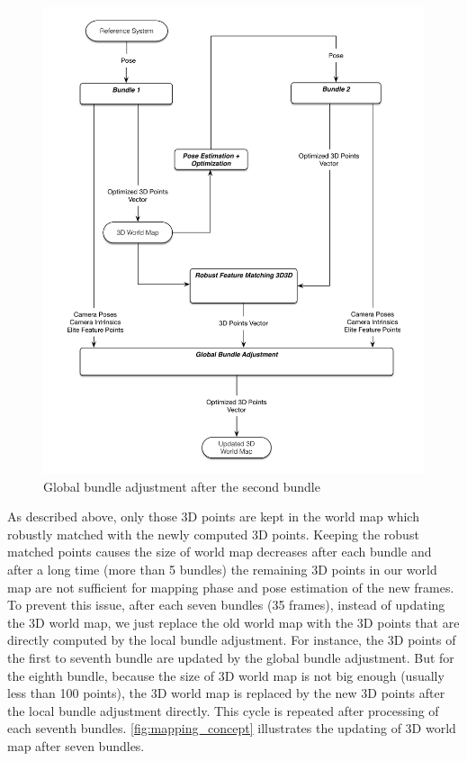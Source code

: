 \begin{figure}[H]
  \centering
  \includegraphics[width=120mm]{figures/global_bundle_adjustment}
  \caption{Global bundle adjustment after the second bundle}\label{fig:global_bundle_adjustment}
\end{figure}

As described above, only those 3D points are kept in the world map which robustly matched with the newly computed 3D points. Keeping the robust matched points causes the size of world map decreases after each bundle and after a long time (more than 5 bundles) the remaining 3D points in our world map are not sufficient for mapping phase and pose estimation of the new frames. To prevent this issue, after each seven bundles (35 frames), instead of updating the 3D world map, we just replace the old world map with the 3D points that are directly computed by the local bundle adjustment. For instance, the 3D points of the first to seventh bundle are updated by the global bundle adjustment. But for the eighth bundle, because the size of 3D world map is not big enough (usually less than 100 points), the 3D world map is replaced by the new 3D points after the local bundle adjustment directly. This cycle is repeated after processing of each seventh bundles. \autoref{fig:mapping_concept} illustrates the updating of 3D world map after seven bundles. 

